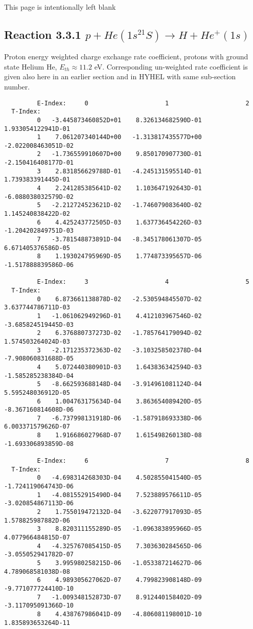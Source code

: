 \documentclass[12pt,dvipdfmx]{article}
\begin{document}
\newpage
This page is intentionally left blank
\newpage
\subsection{
Reaction 3.3.1  $  p + He(1s^21S) \rightarrow  H + He^+(1s) $
}
Proton energy weighted charge exchange rate coefficient,
protons with ground state Helium He, $E_{th} \approx 11.2$ eV.
Corresponding un-weighted rate coefficient is given also here in an earlier section and in HYHEL with same sub-section number.


\begin{small}\begin{verbatim}
         E-Index:     0                     1                     2
  T-Index:
         0   -3.445873460852D+01    8.326134682590D-01    1.933054122941D-01
         1    7.061207340144D+00   -1.313817435577D+00   -2.022008463051D-02
         2   -1.736559910607D+00    9.850170907730D-01   -2.150416408177D-01
         3    2.831856629788D-01   -4.245131595514D-01    1.739383391445D-01
         4    2.241285385641D-02    1.103647192643D-01   -6.088038032579D-02
         5   -2.212724523621D-02   -1.746079083640D-02    1.145240838422D-02
         6    4.425243772505D-03    1.637736454226D-03   -1.204202849751D-03
         7   -3.781548873891D-04   -8.345178061307D-05    6.671405376586D-05
         8    1.193024795969D-05    1.774873395657D-06   -1.517888839586D-06

         E-Index:     3                     4                     5
  T-Index:
         0    6.873661138878D-02   -2.530594845507D-02    3.637744786711D-03
         1   -1.061062949296D-01    4.412103967546D-02   -3.685824519445D-03
         2    6.376880737273D-02   -1.785764179094D-02    1.574503264024D-03
         3   -2.171235372363D-02   -3.103258502378D-04   -7.908060831688D-05
         4    5.072440380901D-03    1.643836342594D-03   -1.585285238384D-04
         5   -8.662593688148D-04   -3.914961081124D-04    5.595248036912D-05
         6    1.004763175634D-04    3.863654089420D-05   -8.367160814608D-06
         7   -6.737998131918D-06   -1.587918693338D-06    6.003371579626D-07
         8    1.916686027968D-07    1.615498260138D-08   -1.693306893859D-08

         E-Index:     6                     7                     8
  T-Index:
         0   -4.698314268303D-04    4.502855041540D-05   -1.724119064743D-06
         1   -4.081552915490D-04    7.523889576611D-05   -3.020854867113D-06
         2    1.755019472132D-04   -3.622077917093D-05    1.578825987882D-06
         3    8.820311155289D-05   -1.096383895966D-05    4.077966484815D-07
         4   -4.325767085415D-05    7.303630284565D-06   -3.055052941782D-07
         5    3.995980258215D-06   -1.053387214627D-06    4.789068581038D-08
         6    4.989305627062D-07    4.799823908148D-09   -9.771077724410D-10
         7   -1.009348152873D-07    8.912440158402D-09   -3.117095091366D-10
         8    4.438767986041D-09   -4.806081198001D-10    1.835893653264D-11


\end{verbatim}
\end{small}
\end{document}

